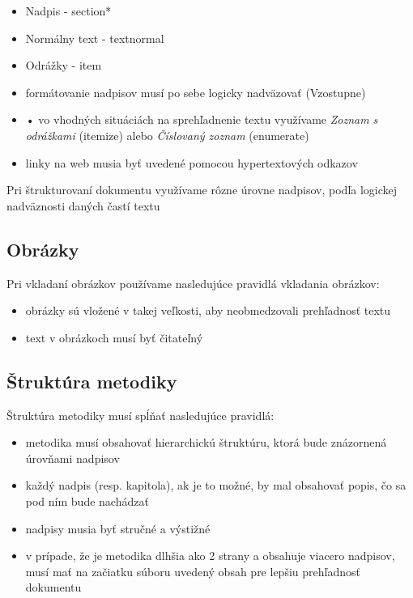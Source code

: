\documentclass{article}
\begin{document}
            \begin{itemize}
                \item Nadpis - section*
                \item Normálny text - textnormal
                \item Odrážky - item
                \item formátovanie nadpisov musí po sebe logicky nadväzovať (Vzostupne)
                \item •	vo vhodných situáciách na sprehľadnenie textu využívame \emph{Zoznam s odrážkami} (itemize) alebo \emph{Číslovaný zoznam} (enumerate)
                \item linky na web musia byť uvedené pomocou hypertextových odkazov
            \end{itemize}

            \noindent \textnormal{Pri štrukturovaní dokumentu využívame rôzne úrovne nadpisov, podľa logickej nadväznosti daných častí textu}


        \subsection*{Obrázky}

            \textnormal{Pri vkladaní obrázkov používame nasledujúce pravidlá vkladania obrázkov:}

            \begin{itemize}
                \item obrázky sú vložené v takej veľkosti, aby neobmedzovali prehľadnosť textu
                \item text v obrázkoch musí byť čitateľný
            \end{itemize}

        \subsection*{Štruktúra metodiky}

            \textnormal{Štruktúra metodiky musí spĺňať nasledujúce pravidlá:}

            \begin{itemize}
                \item metodika musí obsahovať hierarchickú štruktúru, ktorá bude znázornená úrovňami nadpisov
                \item každý nadpis (resp. kapitola), ak je to možné, by mal obsahovať popis, čo sa pod ním bude nachádzať
                \item nadpisy musia byť stručné a výstižné
                \item v prípade, že je metodika dlhšia ako 2 strany a obsahuje viacero nadpisov, musí mať na začiatku súboru uvedený obsah pre lepšiu prehľadnosť dokumentu
            \end{itemize}
\end{document}
